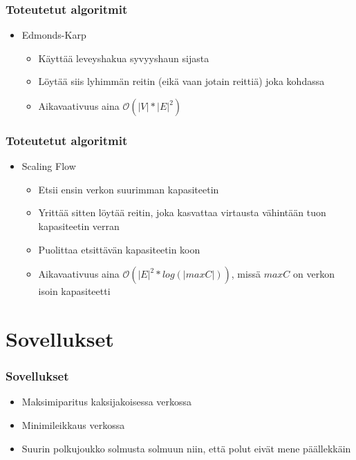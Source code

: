 \documentclass[finnish, svgnames]{beamer}
\begin{document}
\begin{frame}
  \frametitle{Toteutetut algoritmit}
  \begin{itemize}
    \item Edmonds-Karp
      \begin{itemize}
        \item Käyttää leveyshakua syvyyshaun sijasta
        \item Löytää siis lyhimmän reitin (eikä vaan jotain reittiä) joka kohdassa
        \item Aikavaativuus aina $\mathcal{O}{(|V|*|E|^2)}$
      \end{itemize}
  \end{itemize}
\end{frame}

\begin{frame}
  \frametitle{Toteutetut algoritmit}
  \begin{itemize}
    \item Scaling Flow
      \begin{itemize}
        \item Etsii ensin verkon suurimman kapasiteetin
        \item Yrittää sitten löytää reitin, joka kasvattaa virtausta vähintään tuon kapasiteetin verran
        \item Puolittaa etsittävän kapasiteetin koon
        \item Aikavaativuus aina $\mathcal{O}{(|E|^2 * log(|maxC|))}$, missä $maxC$ on verkon isoin kapasiteetti
      \end{itemize}
  \end{itemize}
\end{frame}

\section{Sovellukset}
\begin{frame}
  \frametitle{Sovellukset}
  \begin{itemize}
    \item Maksimiparitus kaksijakoisessa verkossa
    \item Minimileikkaus verkossa
    \item Suurin polkujoukko solmusta solmuun niin, että polut eivät mene päällekkäin
  \end{itemize}

\end{frame}
\end{document}
